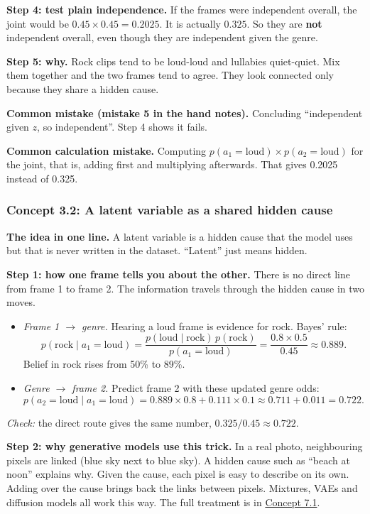 \documentclass[12pt,a4paper]{article}
\begin{document}
\textbf{Step 4: test plain independence.} If the frames were independent overall, the joint would be $0.45\times0.45=0.2025$. It is actually $0.325$. So they are \textbf{not} independent overall, even though they are independent given the genre.

\textbf{Step 5: why.} Rock clips tend to be loud-loud and lullabies quiet-quiet. Mix them together and the two frames tend to agree. They look connected only because they share a hidden cause.

\textbf{Common mistake (mistake 5 in the hand notes).} Concluding ``independent given $z$, so independent''. Step 4 shows it fails.

\textbf{Common calculation mistake.} Computing $p(a_1=\text{loud})\times p(a_2=\text{loud})$ for the joint, that is, adding first and multiplying afterwards. That gives 0.2025 instead of 0.325.

\subsubsection{Concept 3.2: A latent variable as a shared hidden cause}\label{c3-2}

\textbf{The idea in one line.} A latent variable is a hidden cause that the model uses but that is never written in the dataset. ``Latent'' just means hidden.

\textbf{Step 1: how one frame tells you about the other.} There is no direct line from frame 1 to frame 2. The information travels through the hidden cause in two moves.
\begin{itemize}[nosep]
  \item \emph{Frame 1 $\to$ genre.} Hearing a loud frame is evidence for rock. Bayes' rule:
  \[
  p(\text{rock}\mid a_1=\text{loud})=\frac{p(\text{loud}\mid\text{rock})\,p(\text{rock})}{p(a_1=\text{loud})}=\frac{0.8\times0.5}{0.45}\approx0.889 .
  \]
  Belief in rock rises from 50\% to 89\%.
  \item \emph{Genre $\to$ frame 2.} Predict frame 2 with these updated genre odds:
  \[
  p(a_2=\text{loud}\mid a_1=\text{loud})=0.889\times0.8+0.111\times0.1\approx0.711+0.011=0.722 .
  \]
\end{itemize}
\emph{Check:} the direct route gives the same number, $0.325/0.45\approx0.722$.

\textbf{Step 2: why generative models use this trick.} In a real photo, neighbouring pixels are linked (blue sky next to blue sky). A hidden cause such as ``beach at noon'' explains why. Given the cause, each pixel is easy to describe on its own. Adding over the cause brings back the links between pixels. Mixtures, VAEs and diffusion models all work this way. The full treatment is in \hyperref[c7-1]{Concept 7.1}.
\end{document}
